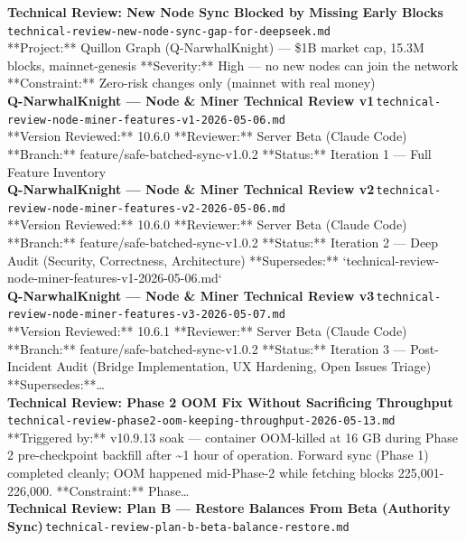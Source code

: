 \documentclass[11pt,a4paper]{article}
\begin{document}
\noindent\textbf{Technical Review: New Node Sync Blocked by Missing Early Blocks}\,\textcolor{qgray}{\small \texttt{technical-review-new-node-sync-gap-for-deepseek.md}}\\
**Project:** Quillon Graph (Q-NarwhalKnight) --- \$1B market cap, 15.3M blocks, mainnet-genesis **Severity:** High --- no new nodes can join the network **Constraint:** Zero-risk changes only (mainnet with real money)\\[6pt]
\noindent\textbf{Q-NarwhalKnight --- Node \& Miner Technical Review v1}\,\textcolor{qgray}{\small \texttt{technical-review-node-miner-features-v1-2026-05-06.md}}\\
**Version Reviewed:** 10.6.0 **Reviewer:** Server Beta (Claude Code) **Branch:** feature/safe-batched-sync-v1.0.2 **Status:** Iteration 1 --- Full Feature Inventory\\[6pt]
\noindent\textbf{Q-NarwhalKnight --- Node \& Miner Technical Review v2}\,\textcolor{qgray}{\small \texttt{technical-review-node-miner-features-v2-2026-05-06.md}}\\
**Version Reviewed:** 10.6.0 **Reviewer:** Server Beta (Claude Code) **Branch:** feature/safe-batched-sync-v1.0.2 **Status:** Iteration 2 --- Deep Audit (Security, Correctness, Architecture) **Supersedes:** `technical-review-node-miner-features-v1-2026-05-06.md`\\[6pt]
\noindent\textbf{Q-NarwhalKnight --- Node \& Miner Technical Review v3}\,\textcolor{qgray}{\small \texttt{technical-review-node-miner-features-v3-2026-05-07.md}}\\
**Version Reviewed:** 10.6.1 **Reviewer:** Server Beta (Claude Code) **Branch:** feature/safe-batched-sync-v1.0.2 **Status:** Iteration 3 --- Post-Incident Audit (Bridge Implementation, UX Hardening, Open Issues Triage) **Supersedes:**\ldots{}\\[6pt]
\noindent\textbf{Technical Review: Phase 2 OOM Fix Without Sacrificing Throughput}\,\textcolor{qgray}{\small \texttt{technical-review-phase2-oom-keeping-throughput-2026-05-13.md}}\\
**Triggered by:** v10.9.13 soak --- container OOM-killed at 16 GB during Phase 2 pre-checkpoint backfill after \textasciitilde{}1 hour of operation. Forward sync (Phase 1) completed cleanly; OOM happened mid-Phase-2 while fetching blocks 225,001-226,000. **Constraint:** Phase\ldots{}\\[6pt]
\noindent\textbf{Technical Review: Plan B --- Restore Balances From Beta (Authority Sync)}\,\textcolor{qgray}{\small \texttt{technical-review-plan-b-beta-balance-restore.md}}\\
\end{document}
